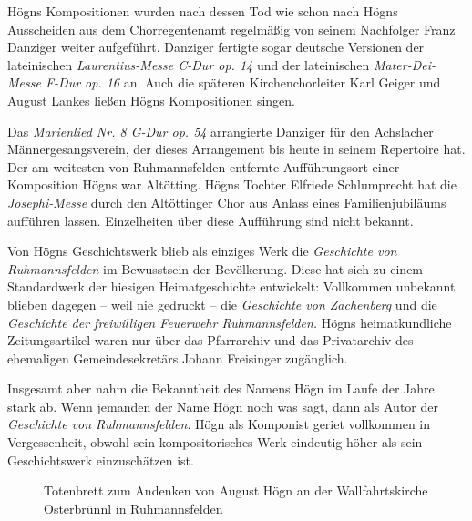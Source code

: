 Högns Kompositionen wurden nach dessen Tod wie schon nach Högns
Ausscheiden aus dem Chorregentenamt regelmäßig von seinem Nachfolger
Franz Danziger weiter aufgeführt. Danziger fertigte sogar deutsche
Versionen der lateinischen \textit{Laurentius-Messe C-Dur op. 14} und
der lateinischen \textit{Mater-Dei-Messe F-Dur op. 16} an. Auch die
späteren Kirchenchorleiter Karl Geiger und August Lankes ließen Högns
Kompositionen singen.

Das \textit{Marienlied Nr. 8 G-Dur op. 54} arrangierte Danziger für den
Achslacher Männergesangsverein, der dieses Arrangement bis heute in
seinem Repertoire hat. Der am weitesten von Ruhmannsfelden entfernte
Aufführungsort einer Komposition Högns war Altötting. Högns Tochter
Elfriede Schlumprecht hat die \textit{Josephi-Messe} durch den
Altöttinger Chor aus Anlass eines Familienjubiläums aufführen lassen.
Einzelheiten über diese Aufführung sind nicht bekannt.

Von Högns Geschichtswerk blieb als einziges Werk die \textit{Geschichte
von Ruhmannsfelden} im Bewusstsein der Bevölkerung. Diese hat sich zu
einem Standardwerk der hiesigen Heimatgeschichte entwickelt:
Vollkommen unbekannt blieben dagegen – weil nie gedruckt – die
\textit{Geschichte von Zachenberg} und die \textit{Geschichte der
freiwilligen Feuerwehr Ruhmannsfelden.} Högns heimatkundliche
Zeitungsartikel waren nur über das Pfarrarchiv und das Privatarchiv
des ehemaligen Gemeindesekretärs Johann Freisinger zugänglich.

Insgesamt aber nahm die Bekanntheit des Namens Högn im Laufe der Jahre
stark ab. Wenn jemanden der Name Högn noch was sagt, dann als Autor
der \textit{Geschichte von Ruhmannsfelden}. Högn als Komponist geriet
vollkommen in Vergessenheit, obwohl sein kompositorisches Werk
eindeutig höher als sein Geschichtswerk einzuschätzen ist.

\begin{figure}
\centering
{}
\caption{Totenbrett zum Andenken von August Högn an der Wallfahrtskirche
Osterbrünnl in Ruhmannsfelden}
\end{figure}